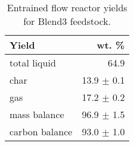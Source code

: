 \begin{table}[H]
    \centering
    \caption{Entrained flow reactor yields for Blend3 feedstock.}
    \begin{tabular}{lr}
        \toprule
        Yield & wt. \% \\
        \midrule
        total liquid   & 64.9 \\
        char           & 13.9 $\pm$ 0.1 \\
        gas            & 17.2 $\pm$ 0.2 \\
        mass balance   & 96.9 $\pm$ 1.5 \\
        carbon balance & 93.0 $\pm$ 1.0 \\
        \bottomrule
    \end{tabular}
\end{table}
